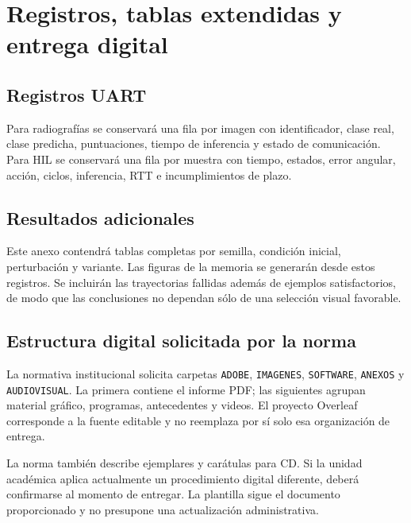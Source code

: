 \chapter{Registros, tablas extendidas y entrega digital}
\section{Registros UART}
Para radiografías se conservará una fila por imagen con identificador, clase real, clase predicha, puntuaciones, tiempo de inferencia y estado de comunicación. Para HIL se conservará una fila por muestra con tiempo, estados, error angular, acción, ciclos, inferencia, RTT e incumplimientos de plazo.

\section{Resultados adicionales}
Este anexo contendrá tablas completas por semilla, condición inicial, perturbación y variante. Las figuras de la memoria se generarán desde estos registros. Se incluirán las trayectorias fallidas además de ejemplos satisfactorios, de modo que las conclusiones no dependan sólo de una selección visual favorable.

\section{Estructura digital solicitada por la norma}
La normativa institucional solicita carpetas \texttt{ADOBE}, \texttt{IMAGENES}, \texttt{SOFTWARE}, \texttt{ANEXOS} y \texttt{AUDIOVISUAL}. La primera contiene el informe PDF; las siguientes agrupan material gráfico, programas, antecedentes y videos. El proyecto Overleaf corresponde a la fuente editable y no reemplaza por sí solo esa organización de entrega.

La norma también describe ejemplares y carátulas para CD. Si la unidad académica aplica actualmente un procedimiento digital diferente, deberá confirmarse al momento de entregar. La plantilla sigue el documento proporcionado y no presupone una actualización administrativa.
